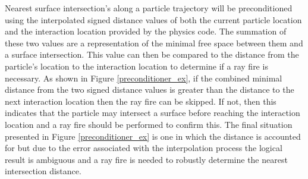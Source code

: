 \documentclass[12pt, a4paper]{article}
\begin{document}
Nearest surface intersection's along a particle trajectory will be preconditioned using the interpolated signed distance values of both the current particle location and the interaction location provided by the physics code. The summation of these two values are a representation of the minimal free space between them and a surface intersection. This value can then be compared to the distance from the particle's location to the interaction location to determine if a ray fire is necessary. As shown in Figure \ref{preconditioner_ex}, if the combined minimal distance from the two signed distance values is greater than the distance to the next interaction location then the ray fire can be skipped. If not, then this indicates that the particle may intersect a surface before reaching the interaction location and a ray fire should be performed to confirm this. The final situation presented in Figure \ref{preconditioner_ex} is one in which the distance is accounted for but due to the error associated with the interpolation process the logical result is ambiguous and a ray fire is needed to robustly determine the nearest intersection distance. 
\end{document}
